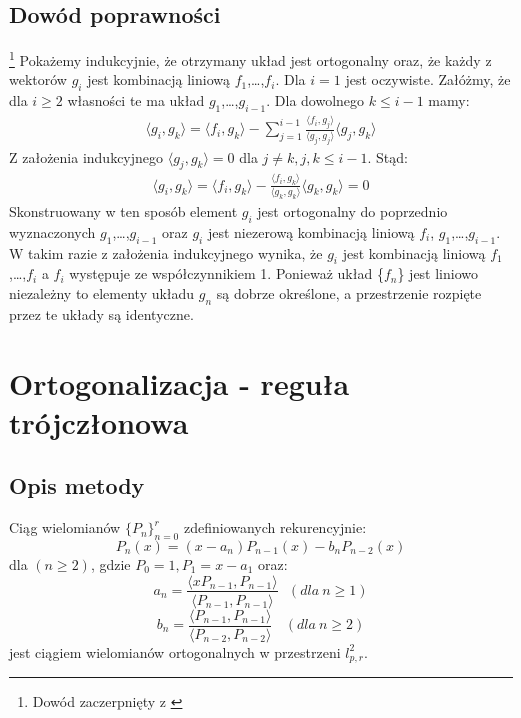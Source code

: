 \documentclass[12pt,wide]{mwart}
\begin{document}
\subsection{Dowód poprawności}\footnote{Dowód zaczerpnięty z \cite[strona 90]{JMJ}} 
Pokażemy indukcyjnie, że otrzymany układ jest ortogonalny oraz, że każdy z wektorów $g_i$ jest kombinacją liniową $f_1$,\ldots,$f_i$. Dla $i=1$ jest oczywiste. Załóżmy, że dla $i \geq 2$ własności te ma układ $g_1$,\ldots,$g_{i-1}$. Dla dowolnego $ k \leq i-1$ mamy:
\begin{eqnarray*}
	\langle g_i,g_k\rangle = \langle f_i,g_k\rangle - \sum^{i-1}_{j=1} \frac{\langle f_i,g_j\rangle}{\langle g_j,g_j\rangle}\langle g_j,g_k\rangle
\end{eqnarray*}
Z założenia indukcyjnego $\langle g_j,g_k\rangle = 0$ dla $j\neq k, j,k \leq i-1$. Stąd:
\begin{eqnarray*}
	\langle g_i,g_k\rangle = \langle f_i,g_k\rangle - \frac{\langle f_i,g_k\rangle}{\langle g_k,g_k\rangle}\langle g_k,g_k\rangle = 0
\end{eqnarray*}
Skonstruowany w ten sposób element $g_i$ jest ortogonalny do poprzednio wyznaczonych $g_1$,\ldots,$g_{i-1}$ oraz $g_i$ jest niezerową kombinacją liniową $f_i$, $g_1$,\ldots,$g_{i-1}$. W takim razie z założenia indukcyjnego wynika, że $g_i$ jest kombinacją liniową $f_1$,\ldots,$f_i$ a $f_i$ występuje ze współczynnikiem 1. Ponieważ układ \{$f_n$\} jest liniowo niezależny to elementy układu {$g_n$} są dobrze określone, a przestrzenie rozpięte przez te układy są identyczne.

\section{Ortogonalizacja - reguła trójczłonowa}
 
\subsection{Opis metody}
Ciąg wielomianów $\{P_n\}^r_{n=0}$ zdefiniowanych rekurencyjnie:
$$
	P_n(x) = (x-a_n)P_{n-1}(x) - b_n P_{n-2}(x)
$$
dla $(n \geq 2)$, gdzie $P_0 = 1, P_1 = x - a_1$ oraz:
$$
	a_n = \frac{\langle xP_{n-1},P_{n-1} \rangle}{\langle P_{n-1},P_{n-1} \rangle} \ \ \ (dla \ n \geq 1)
$$
$$
	b_n = \frac{\langle P_{n-1},P_{n-1} \rangle}{\langle P_{n-2},P_{n-2} \rangle} \ \ \ \ (dla \ n \geq 2)
$$
jest ciągiem wielomianów ortogonalnych w przestrzeni $l^2_{p,r}$.
\end{document}
